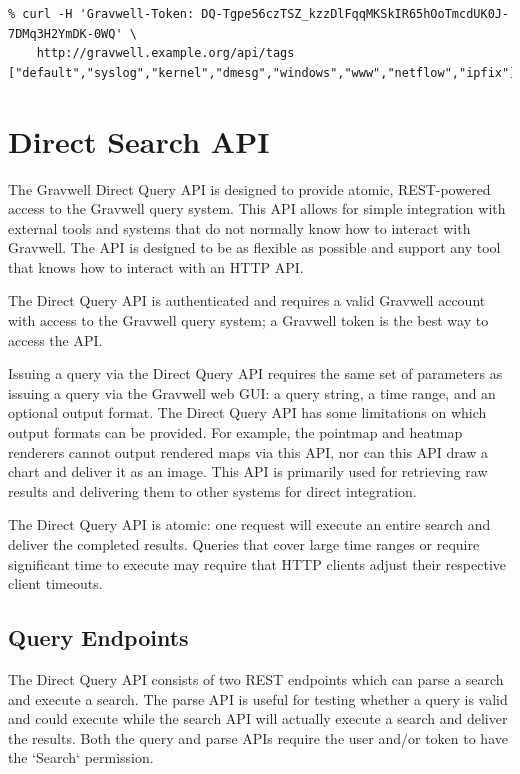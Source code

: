 \begin{verbatim}
% curl -H 'Gravwell-Token: DQ-Tgpe56czTSZ_kzzDlFqqMKSkIR65hOoTmcdUK0J-7DMq3H2YmDK-0WQ' \
	http://gravwell.example.org/api/tags
["default","syslog","kernel","dmesg","windows","www","netflow","ipfix"]
\end{verbatim}

\section{Direct Search API}
The Gravwell Direct Query API is designed to provide atomic, REST-powered access to the Gravwell query system.  This API allows for simple integration with external tools and systems that do not normally know how to interact with Gravwell.  The API is designed to be as flexible as possible and support any tool that knows how to interact with an HTTP API.

The Direct Query API is authenticated and requires a valid Gravwell account with access to the Gravwell query system; a Gravwell token is the best way to access the API.

Issuing a query via the Direct Query API requires the same set of parameters as issuing a query via the Gravwell web GUI: a query string, a time range, and an optional output format.  The Direct Query API has some limitations on which output formats can be provided.  For example, the pointmap and heatmap renderers cannot output rendered maps via this API, nor can this API draw a chart and deliver it as an image.  This API is primarily used for retrieving raw results and delivering them to other systems for direct integration.

The Direct Query API is atomic: one request will execute an entire search and deliver the completed results.  Queries that cover large time ranges or require significant time to execute may require that HTTP clients adjust their respective client timeouts.

\subsection{Query Endpoints}

The Direct Query API consists of two REST endpoints which can parse a search and execute a search.  The parse API is useful for testing whether a query is valid and could execute while the search API will actually execute a search and deliver the results.  Both the query and parse APIs require the user and/or token to have the `Search` permission.

